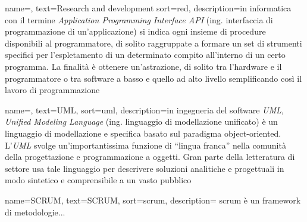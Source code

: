 
\renewcommand{\acronymname}{Acronimi e abbreviazioni}






\renewcommand{\glossaryname}{Glossario}

{
    name=,
    text=Research and development
    sort=red,
    description={in informatica con il termine \emph{Application Programming Interface API} (ing. interfaccia di programmazione di un'applicazione) si indica ogni insieme di procedure disponibili al programmatore, di solito raggruppate a formare un set di strumenti specifici per l'espletamento di un determinato compito all'interno di un certo programma. La finalità è ottenere un'astrazione, di solito tra l'hardware e il programmatore o tra software a basso e quello ad alto livello semplificando così il lavoro di programmazione}
}

{
    name=,
    text=UML,
    sort=uml,
    description={in ingegneria del software \emph{UML, Unified Modeling Language} (ing. linguaggio di modellazione unificato) è un linguaggio di modellazione e specifica basato sul paradigma object-oriented. L'\emph{UML} svolge un'importantissima funzione di ``lingua franca'' nella comunità della progettazione e programmazione a oggetti. Gran parte della letteratura di settore usa tale linguaggio per descrivere soluzioni analitiche e progettuali in modo sintetico e comprensibile a un vasto pubblico}
}

{
    name=SCRUM,
    text=SCRUM,
    sort=scrum,
    description={
    scrum è un framework di metodologie...
    }
}


